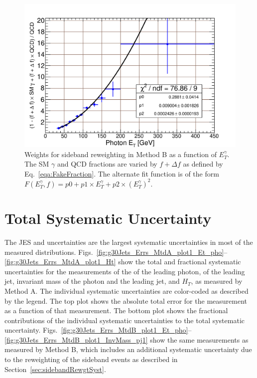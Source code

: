 \begin{figure}[p]
 \centering
 \includegraphics[scale=0.85,keepaspectratio=true]{./MtdB_Sideband_SigmaWeights.pdf}
 \caption{Weights for sideband reweighting in Method B as a function of $E^{\gamma}_{T}$. The SM $\gamma$ and QCD fractions are varied by $f+\Delta f$ as defined by Eq.~\ref{eqa:FakeFraction}. The alternate fit function is of the form $F(E_{T}^{\gamma},f)= p0+p1\times E_{T}^{\gamma}+p2\times(E_{T}^{\gamma})^{2}$.}
 \label{fig:SidebandPhoEtWgts}
\end{figure}


\section{Total Systematic Uncertainty}
The JES and \alphas uncertainties are the largest systematic uncertainties in most of the measured distributions. Figs.~\ref{fig:g30Jets_Errs_MtdA_plot1_Et_pho}--\ref{fig:g30Jets_Errs_MtdA_plot1_Ht} show the total and fractional systematic uncertainties for the measurements of the \et of the leading photon, \et of the leading jet, invariant mass of the photon and the leading jet, and $H_{T}$, as measured by Method A. The individual systematic uncertainties are color-coded as described by the legend. The top plot shows the absolute total error for the measurement as a function of that measurement. The bottom plot shows the fractional contributions of the individual systematic uncertainties to the total systematic uncertainty. Figs.~\ref{fig:g30Jets_Errs_MtdB_plot1_Et_pho}--\ref{fig:g30Jets_Errs_MtdB_plot1_InvMass_pj1} show the same measurements as measured by Method B, which includes an additional systematic uncertainty due to the reweighting of the sideband events as described in Section~\ref{sec:sidebandRewgtSyst}.

